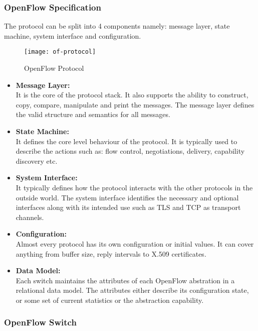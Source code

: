 \subsubsection{OpenFlow Specification \cite{Openflow_protocol_spec}} \label{OpenFlow_Protocol_spec}
The protocol can be split into 4 components namely: message layer, state machine, system interface and configuration. 
\begin{figure}[H]
	\centering
	\texttt{[image: of-protocol]}
	\caption{OpenFlow Protocol \cite{of_protocol_spec_img}} \label{fig:Of_proto}
	\vspace{-10pt}
\end{figure}

\begin{itemize}
	\item \textbf{Message Layer:} 
	\\ It is the core of the protocol stack. It also supports the ability to construct, copy, compare, manipulate and print the messages. The message layer defines the valid structure and semantics for all messages.   
	\item \textbf{State Machine:}
	\\ It defines the core level behaviour of the protocol. It is typically used to describe the actions such as: flow control, negotiations, delivery, capability discovery etc.
	\item \textbf{System Interface:}
	\\ It typically defines how the protocol interacts with the other protocols in the outside world. The system interface identifies the necessary and optional interfaces along with its intended use such as TLS and TCP as transport channels.
	\item \textbf{Configuration:}
	\\ Almost every protocol has its own configuration or initial values. It can cover anything from buffer size, reply intervals to X.509 certificates.
	\item \textbf{Data Model:}
	\\ Each switch maintains the attributes of each OpenFlow abstration in a relational data model.  The attributes either describe its configuration state, or some set of current statistics or the abstraction capability. 

\end{itemize}

\subsubsection{OpenFlow Switch \cite{Opnflow_switch}} \label{OpenFlow_Switch}

